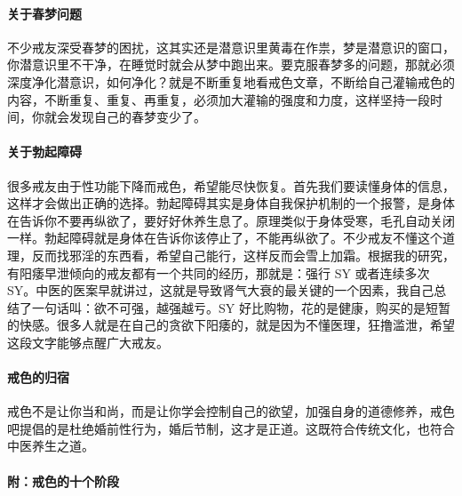 \documentclass{ctexart}
\begin{document}
\paragraph{关于春梦问题}

不少戒友深受春梦的困扰，这其实还是潜意识里黄毒在作祟，梦是潜意识的窗口，你潜意识里不干净，在睡觉时就会从梦中跑出来。要克服春梦多的问题，那就必须深度净化潜意识，如何净化？就是不断重复地看戒色文章，不断给自己灌输戒色的内容，不断重复、重复、再重复，必须加大灌输的强度和力度，这样坚持一段时间，你就会发现自己的春梦变少了。

\paragraph{关于勃起障碍}

很多戒友由于性功能下降而戒色，希望能尽快恢复。首先我们要读懂身体的信息，这样才会做出正确的选择。勃起障碍其实是身体自我保护机制的一个报警，是身体在告诉你不要再纵欲了，要好好休养生息了。原理类似于身体受寒，毛孔自动关闭一样。勃起障碍就是身体在告诉你该停止了，不能再纵欲了。不少戒友不懂这个道理，反而找邪淫的东西看，希望自己能行，这样反而会雪上加霜。根据我的研究，有阳痿早泄倾向的戒友都有一个共同的经历，那就是：强行 SY 或者连续多次 SY。中医的医案早就讲过，这就是导致肾气大衰的最关键的一个因素，我自己总结了一句话叫：欲不可强，越强越亏。SY 好比购物，花的是健康，购买的是短暂的快感。很多人就是在自己的贪欲下阳痿的，就是因为不懂医理，狂撸滥泄，希望这段文字能够点醒广大戒友。

\paragraph{戒色的归宿}

戒色不是让你当和尚，而是让你学会控制自己的欲望，加强自身的道德修养，戒色吧提倡的是杜绝婚前性行为，婚后节制，这才是正道。这既符合传统文化，也符合中医养生之道。

\paragraph{附：戒色的十个阶段}
\end{document}
